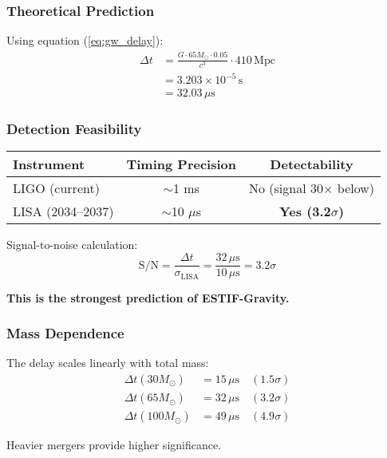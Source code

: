 \documentclass[12pt]{article}
\begin{document}
\subsubsection{Theoretical Prediction}

Using equation (\ref{eq:gw_delay}):
\begin{align}
\Delta t &= \frac{G \cdot 65 M_\odot \cdot 0.05}{c^3} \cdot 410 \, \text{Mpc} \\
&= 3.203 \times 10^{-5} \, \text{s} \\
&= 32.03 \, \mu\text{s}
\end{align}

\subsubsection{Detection Feasibility}

\begin{center}
\begin{tabular}{lcc}
\hline
Instrument & Timing Precision & Detectability \\
\hline
LIGO (current) & $\sim$1 ms & No (signal 30$\times$ below) \\
LISA (2034--2037) & $\sim$10 $\mu$s & \textbf{Yes (3.2$\sigma$)} \\
\hline
\end{tabular}
\end{center}

Signal-to-noise calculation:
\begin{equation}
\text{S/N} = \frac{\Delta t}{\sigma_{\text{LISA}}} = \frac{32 \, \mu\text{s}}{10 \, \mu\text{s}} = 3.2\sigma
\end{equation}

\textbf{This is the strongest prediction of ESTIF-Gravity.}

\subsubsection{Mass Dependence}

The delay scales linearly with total mass:
\begin{align}
\Delta t (30 M_\odot) &= 15 \, \mu\text{s} \quad (1.5\sigma) \\
\Delta t (65 M_\odot) &= 32 \, \mu\text{s} \quad (3.2\sigma) \\
\Delta t (100 M_\odot) &= 49 \, \mu\text{s} \quad (4.9\sigma)
\end{align}

Heavier mergers provide higher significance.
\end{document}
